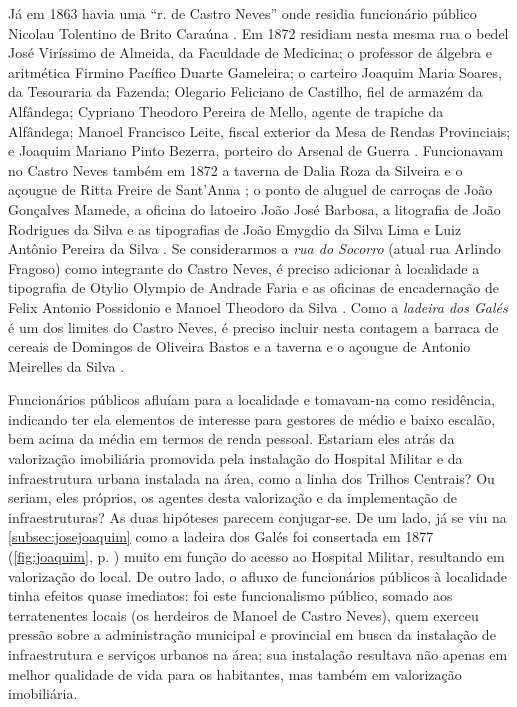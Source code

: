Já em 1863 havia uma ``r. de Castro Neves'' onde residia funcionário público Nicolau Tolentino de Brito Caraúna \cite[p.~125]{masson_almanak_1863}. Em 1872 residiam nesta mesma rua o bedel José Viríssimo de Almeida, da Faculdade de Medicina; o professor de álgebra e aritmética Firmino Pacífico Duarte Gameleira; o carteiro Joaquim Maria Soares, da Tesouraria da Fazenda; Olegario Feliciano de Castilho, fiel de armazém da Alfândega; Cypriano Theodoro Pereira de Mello, agente de trapiche da Alfândega; Manoel Francisco Leite, fiscal exterior da Mesa de Rendas Provinciais; e Joaquim Mariano Pinto Bezerra, porteiro do Arsenal de Guerra \cite[segunda~parte, pp.~94, 96, 167, 170, 184, 194]{pimenta_almanak_1872}. Funcionavam no Castro Neves também em 1872 a taverna de Dalia Roza da Silveira e o açougue de Ritta Freire de Sant'Anna \cite[terceira~parte, pp.~41, 54]{pimenta_almanak_1872}; o ponto de aluguel de carroças de João Gonçalves Mamede, a oficina do latoeiro João José Barbosa, a litografia de João Rodrigues da Silva e as tipografias de João Emygdio da Silva Lima e Luiz Antônio Pereira da Silva \cite[quarta parte, pp.~20, 32, 36, 38]{pimenta_almanak_1872}. Se considerarmos a \textit{rua do Socorro} (atual rua Arlindo Fragoso) como integrante do Castro Neves, é preciso adicionar à localidade a tipografia de Otylio Olympio de Andrade Faria e as oficinas de encadernação de Felix Antonio Possidonio e Manoel Theodoro da Silva \cite[quarta parte, pp.~38, 39]{pimenta_almanak_1872}. Como a \textit{ladeira dos Galés} é um dos limites do Castro Neves, é preciso incluir nesta contagem a barraca de cereais de Domingos de Oliveira Bastos e a taverna e o açougue de Antonio Meirelles da Silva \cite[terceira~parte, pp.~39, 53, 56]{pimenta_almanak_1872}.

Funcionários públicos afluíam para a localidade e tomavam-na como residência, indicando ter ela elementos de interesse para gestores de médio e baixo escalão, bem acima da média em termos de renda pessoal. Estariam eles atrás da valorização imobiliária promovida pela instalação do Hospital Militar e da infraestrutura urbana instalada na área, como a linha dos Trilhos Centrais? Ou seriam, eles próprios, os agentes desta valorização e da implementação de infraestruturas? As duas hipóteses parecem conjugar-se. De um lado, já se viu na \autoref{subsec:josejoaquim} como a ladeira dos Galés foi consertada em 1877 (\autoref{fig:joaquim}, p. \pageref{fig:joaquim}) muito em função do acesso ao Hospital Militar, resultando em valorização do local. De outro lado, o afluxo de funcionários públicos à localidade tinha efeitos quase imediatos: foi este funcionalismo público, somado aos terratenentes locais (os herdeiros de Manoel de Castro Neves), quem exerceu pressão sobre a administração municipal e provincial em busca da instalação de infraestrutura e serviços urbanos na área; sua instalação resultava não apenas em melhor qualidade de vida para os habitantes, mas também em valorização imobiliária. 


